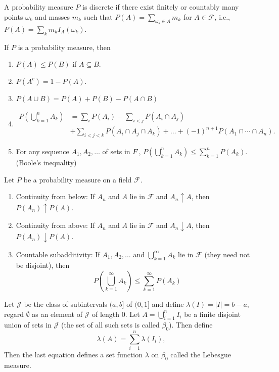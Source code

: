 \documentclass[11pt]{article}
\newcommand{\F}{\mathcal{F}}
\newcommand{\B}{\beta}
\newcommand{\J}{\mathcal{J}}
\newcommand{\seq}{\subseteq}
\newcommand{\es}{\emptyset}
\newcommand{\mc}{\mathcal}
\newcommand{\un}{\cup}
\newcommand{\ic}{\cap}
\newenvironment{theorem}[2][Theorem]{\begin{trivlist}
\item[\hskip \labelsep {\bfseries #1}\hskip \labelsep {\bfseries #2.}]}{\end{trivlist}}
\newenvironment{definition}[2][Definition]{\begin{trivlist}
\item[\hskip \labelsep {\bfseries #1}\hskip \labelsep {\bfseries #2.}]}{\end{trivlist}}
\newenvironment{rmrk}[2][Remark]{\begin{trivlist}
\item[\hskip \labelsep {\bfseries #1}\hskip \labelsep {\bfseries #2.}]}{\end{trivlist}}
\begin{document}
\begin{definition}{10}
    A probability measure $P$ is discrete if there exist finitely or countably many points $\omega_k$ and masses $m_k$ such that $P(A) = \sum_{\omega_k \in A} m_k$ for $A \in \F$, i.e., $P(A) = \sum_{k} m_k I_A (\omega_k)$.
\end{definition}

\begin{rmrk}{11}
    If $P$ is a probability measure, then
    \begin{enumerate}
        \item $P(A) \leq P(B)$ if $A \seq B$.
        \item $P(A^c) = 1 - P(A)$.
        \item $P(A \un B) = P(A) + P(B) - P(A \ic B)$
        \item 
        \begin{align*}
            P\left ( \bigcup_{k=1}^{n} A_k \right) &= \sum_{i} P(A_i) - \sum_{i < j} P(A_i \ic A_j) \\
            &+ \sum_{i < j < k} P(A_i \ic A_j \ic A_k) + \ldots + (-1)^{n+1} P(A_1 \ic \cdots \ic A_n).
        \end{align*}
        \item For any sequence $A_1, A_2, \ldots$ of sets in $\mc \F$, $P( \bigcup_{k=1}^{n} A_k) \leq \sum_{k=1}^{n} P(A_k)$. (Boole's inequality)
    \end{enumerate}
\end{rmrk}

\begin{theorem}{2.1}
    Let $P$ be a probability measure on a field $\mc F$.
    \begin{enumerate}
        \item Continuity from below: If $A_n$ and $A$ lie in $\F$ and $A_n \uparrow A$, then $P(A_n) \uparrow P(A)$.
        \item Continuity from above: If $A_n$ and $A$ lie in $\F$ and $A_n \downarrow A$, then $P(A_n) \downarrow P(A)$.
        \item Countable subadditivity: If $A_1, A_2, \ldots$ and $\bigcup_{k=1}^{\infty} A_k$ lie in $\F$ (they need not be disjoint), then
        \[ P \left ( \bigcup_{k=1}^{\infty} A_k \right) \leq \sum_{k=1}^{\infty} P(A_k) \]
    \end{enumerate}
\end{theorem}

\begin{definition}{12}
    Let $\J$ be the class of subintervals $(a, b]$ of $(0, 1]$ and define $\lambda (I) = |I| = b - a$, regard $\es$ as an element of $\J$ of length $0$. Let $A = \bigcup_{i=1}^{n} I_i$ be a finite disjoint union of sets in $\J$ (the set of all such sets is called $\B_0$). Then define \[ \lambda (A) = \sum_{i=1}^{n} \lambda(I_i), \]
    Then the last equation defines a set function $\lambda$ on $\B_0$ called the Lebesgue measure.
\end{definition}
\end{document}
